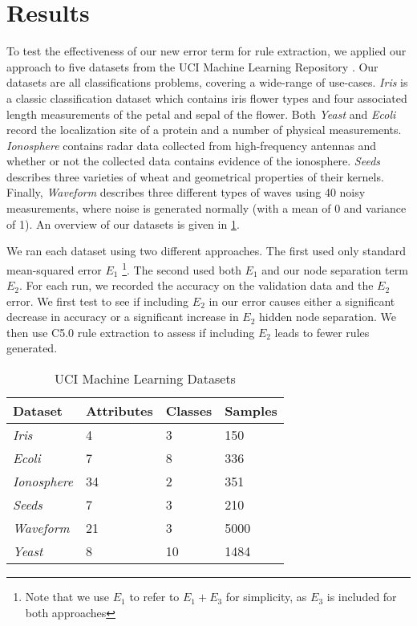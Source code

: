 \section{Results}
\label{sec:results}

To test the effectiveness of our new error term for rule extraction,
we applied our approach to five 
datasets from the UCI Machine Learning Repository \cite{uci}. Our
datasets are all classifications problems, covering a wide-range of
use-cases. \textit{Iris} is a classic classification dataset which
contains iris flower types and four associated length
measurements of the petal and sepal of the flower.
Both \textit{Yeast} and \textit{Ecoli}
record the localization site of a protein and a number of
physical measurements. \textit{Ionosphere} contains radar data collected
from high-frequency antennas and whether or not the collected data
contains evidence of the ionosphere. \textit{Seeds} describes three
varieties of wheat and geometrical properties of their kernels.
Finally, \textit{Waveform} describes three different types of waves
using 40 noisy measurements, where noise is generated normally
(with a mean of 0 and variance of 1).
An overview of our datasets is given in \ref{tab:datasets}.

We ran each dataset using two different approaches. The first
used only standard mean-squared error $E_1$
\footnote{Note that we use $E_1$ to refer to $E_1+E_3$ for simplicity, as
$E_3$ is included for both approaches}. The second used both
$E_1$ and our node separation term $E_2$. For each run, we recorded
the accuracy on the validation data and the $E_2$ error.
We first test to see if including $E_2$ in our error causes either
a significant decrease in accuracy or a significant increase
in $E_2$ hidden node separation. We then use C5.0 rule extraction
to assess if including $E_2$ leads to fewer rules generated.

\begin{table}[]
  \centering
\begin{tabular}{@{}llll@{}}
\toprule
Dataset             & Attributes & Classes & Samples \\ \midrule
\textit{Iris}       & 4          & 3       & 150     \\
\textit{Ecoli}      & 7          & 8       & 336     \\
\textit{Ionosphere} & 34         & 2       & 351     \\
\textit{Seeds}      & 7          & 3       & 210     \\
\textit{Waveform}   & 21         & 3       & 5000    \\ 
\textit{Yeast}      & 8          & 10      & 1484    \\ \bottomrule
\end{tabular}
\caption{UCI Machine Learning Datasets}
\label{tab:datasets}
\end{table}

